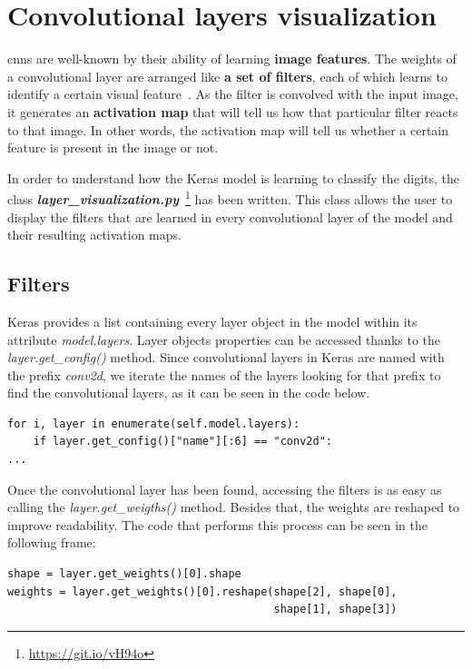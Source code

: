 \section{Convolutional layers visualization}\label{sec:visualization}
\glspl{cnn} are well-known by their ability of learning \textbf{image features}. The weights of a convolutional layer are arranged like \textbf{a set of filters}, each of which learns to identify a certain visual feature~\cite{cs231n}. As the filter is convolved with the input image, it generates an \textbf{activation map} that will tell us how that particular filter reacts to that image. In other words, the activation map will tell us whether a certain feature is present in the image or not.

In order to understand how the Keras model is learning to classify the digits, the class \textbf{\textit{layer\_visualization.py}}~\footnote{\url{https://git.io/vH94o}} has been written. This class allows the user to display the filters that are learned in every convolutional layer of the model and their resulting activation maps.

\subsection{Filters}
Keras provides a list containing every layer object in the model within its attribute \textit{model.layers}. Layer objects properties can be accessed thanks to the \textit{layer.get\_config()} method. Since convolutional layers in Keras are named with the prefix \textit{conv2d}, we iterate the names of the layers looking for that prefix to find the convolutional layers, as it can be seen in the code below.

\begin{lstlisting}
for i, layer in enumerate(self.model.layers):
	if layer.get_config()["name"][:6] == "conv2d":
...
\end{lstlisting}

Once the convolutional layer has been found, accessing the filters is as easy as calling the \textit{layer.get\_weigths()} method. Besides that, the weights are reshaped to improve readability. The code that performs this process can be seen in the following frame:

\begin{lstlisting}
shape = layer.get_weights()[0].shape
weights = layer.get_weights()[0].reshape(shape[2], shape[0],
                                         shape[1], shape[3])
\end{lstlisting}

